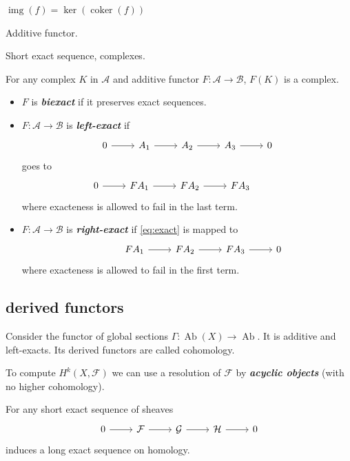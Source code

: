 \documentclass{article}
\newcommand{\Ac}{\mathcal{A}}
\newcommand{\Bc}{\mathcal{B}}
\newcommand{\Fc}{\mathcal{F}}
\newcommand{\Gc}{\mathcal{G}}
\newcommand{\Hc}{\mathcal{H}}
\DeclareMathOperator{\img}{img}
\DeclareMathOperator{\Ab}{Ab}
\DeclareMathOperator{\coker}{coker}
\begin{document}
\begin{defn}
	$\img(f)=\ker(\coker(f))$
\end{defn}
\begin{defn}
	Additive functor.
\end{defn}
\begin{defn}
	Short exact sequence, complexes.
\end{defn}
\begin{remark}
	For any complex $K$ in $\Ac$ and additive functor $F:\Ac\to\Bc$, $F(K)$ is a complex.
\end{remark}
\begin{defn}
	\begin{itemize}
		\item $F$ is \textbf{\textit{biexact}} if it preserves exact sequences.
		\item $F:\Ac\to\Bc$ is \textbf{\textit{left-exact}} if 
		\begin{equation}\label{eq:exact}
			\begin{tikzcd}
			0\arrow[r]&A_1\arrow[r]&A_2\arrow[r]&A_3\arrow[r]&0
		\end{tikzcd}
		\end{equation}
		goes to
		\[\begin{tikzcd}
			0\arrow[r]&FA_1\arrow[r]&FA_2\arrow[r]&FA_3\arrow[r,phantom]& \leavevmode
		\end{tikzcd}\]
		where exacteness is allowed to fail in the last term.
		\item $F:\Ac\to\Bc$ is \textbf{\textit{right-exact}} if \cref{eq:exact} is mapped to
		\[\begin{tikzcd}
			\leavevmode\arrow[r,phantom]&FA_1\arrow[r]&FA_2\arrow[r]&FA_3\arrow[r]& 0
		\end{tikzcd}\]
		where exacteness is allowed to fail in the first term.
	\end{itemize}
\end{defn}

\subsection{derived functors}
Consider the functor of global sections $\Gamma:\Ab(X)\to\Ab$. It is additive and left-exacts. Its derived functors are called cohomology.

To compute $H^k(X,\Fc)$ we can use a resolution of $\Fc$ by \textbf{\textit{acyclic objects}} (with no higher cohomology).

\begin{claim}
	For any short exact sequence of sheaves
	\[\begin{tikzcd}
		0\arrow[r]&\Fc\arrow[r]&\Gc\arrow[r]&\Hc\arrow[r]&0
	\end{tikzcd}\]
	induces a long exact sequence on homology.
\end{claim}
\end{document}

